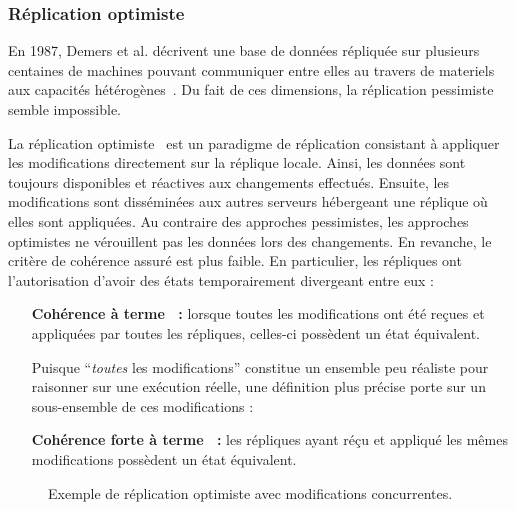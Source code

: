 \subsubsection{Réplication optimiste}
\label{repl:subsubsec:optimistic}

En 1987, Demers et al. décrivent une base de données répliquée sur plusieurs
centaines de machines pouvant communiquer entre elles au travers de materiels
aux capacités hétérogènes~\cite{demers1987epidemic}. Du fait de ces dimensions,
la réplication pessimiste semble impossible.

La réplication optimiste~\cite{johnson1975maintenance, saito2005optimistic} est
un paradigme de réplication consistant à appliquer les modifications directement
sur la réplique locale.  Ainsi, les données sont toujours disponibles et
réactives aux changements effectués. Ensuite, les modifications sont disséminées
aux autres serveurs hébergeant une réplique où elles sont appliquées. Au
contraire des approches pessimistes, les approches optimistes ne vérouillent pas
les données lors des changements. En revanche, le critère de cohérence assuré
est plus faible. En particulier, les répliques ont l'autorisation d'avoir des
états temporairement divergeant entre eux :

\begin{itemize}
\item [\textbf{Cohérence à terme~\cite{bailis2013eventual} :}] lorsque toutes
  les modifications ont été reçues et appliquées par toutes les répliques,
  celles-ci possèdent un état équivalent.

  Puisque ``\emph{toutes} les modifications'' constitue un ensemble peu réaliste
  pour raisonner sur une exécution réelle, une définition plus précise porte sur
  un sous-ensemble de ces modifications :
\item [\textbf{Cohérence forte à terme~\cite{shapiro2011conflict} :}] les
  répliques ayant réçu et appliqué les mêmes modifications possèdent un état
  équivalent.
\end{itemize}

\begin{figure*}
  \centering
  \hspace{10pt}
  \caption{\label{repl:fig:optimisticexample} Exemple de réplication optimiste
    avec modifications concurrentes.}
\end{figure*}


